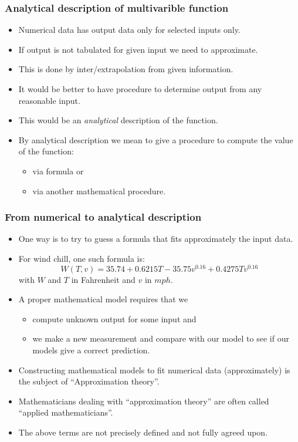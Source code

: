 \begin{frame}\frametitle{Analytical description of multivarible function}

\begin{itemize}
\item Numerical data has output data only for selected inputs only. 
\item If output is not tabulated for given input we need to approximate.
\item This is done by inter/extrapolation from given information. 
\item It would be better to have procedure to determine output from any reasonable input. 
\item This would be an \emph{analytical} description of the function. 
\item By analytical description we mean to give a procedure to compute the value of the function:
\begin{itemize}
\item via formula or
\item via another mathematical procedure.
\end{itemize}

\end{itemize}
\end{frame}
\begin{frame}\frametitle{From numerical to analytical description}

\begin{itemize}
\item<1-> One way is to try to guess a formula that fits approximately the input data. 
\item<2-> For wind chill, one such formula is:
$$W(T,v)= 35.74+0.6215 T - 35.75 v^{0.16} +0.4275 Tv^{0.16}$$
  with $W$ and $T$ in Fahrenheit and $v$ in $mph$.
\item<3-> A proper mathematical model requires that we
\begin{itemize}
\item<4-> compute unknown output for some input and 
\item<5-> we make a new measurement and compare with our model to see if our models give a correct prediction.
\end{itemize}
\item<6-> Constructing mathematical models to fit numerical data (approximately) is the subject of ``\alert<8>{Approximation theory}''. 
\item<7-> Mathematicians dealing with ``\alert<8>{approximation theory}'' are often called ``applied mathematicians''.
\item<8-> The \alert<8>{above terms} are not precisely defined and not fully agreed upon. 
\end{itemize}
\end{frame}
